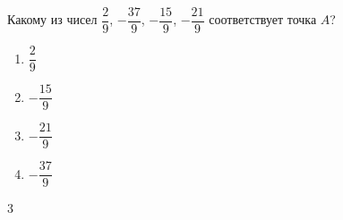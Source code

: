 \begin{ex}
	Какому из чисел $\dfrac{2}{9}$, $-\dfrac{37}{9}$, $-\dfrac{15}{9}$, $-\dfrac{21}{9}$ соответствует точка $A$?
	
	\selectanswer
	\begin{multicols}{4}
		\begin{enumerate}[label=\arabic*)]
			\item $\dfrac{2}{9}$
			\item $-\dfrac{15}{9}$
			\item $-\dfrac{21}{9}$
			\item $-\dfrac{37}{9}$
		\end{enumerate}
	\end{multicols}
	\begin{answer}
		3
	\end{answer}
\end{ex}